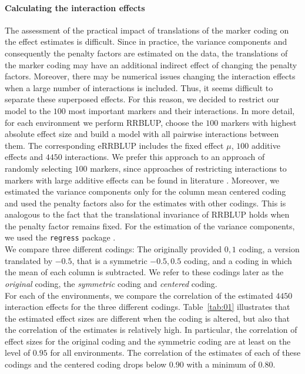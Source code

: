 \documentclass{bmcart}
\newcommand{\0}{\mathbf{0}}
\begin{document}
\paragraph{Calculating the interaction effects} 
The assessment of the practical impact of translations of the marker coding on the effect estimates is difficult. 
Since in practice, the variance components and consequently the penalty factors are estimated on the data, the translations of the marker coding may have an additional indirect effect of changing the penalty factors. Moreover, there may be numerical issues changing the interaction effects when a large number of interactions is included.
Thus, it seems difficult to separate these superposed effects. For this reason, we decided to restrict our model to the $100$ most important markers and their interactions. In more detail, for each environment we perform RRBLUP, choose the $100$ markers with highest absolute effect size and build a model with all pairwise interactions between them. The corresponding eRRBLUP includes the fixed effect $\mu$, $100$ additive effects and $4450$ interactions. We prefer this approach to an approach of randomly selecting $100$ markers, since approaches of restricting interactions to markers with large additive effects can be found in literature \cite{karkkainen2015efficient}. Moreover, we estimated the variance components only for the column mean centered coding and used the penalty factors also for the estimates with other codings. This is analogous to the fact that the translational invariance of RRBLUP holds when the penalty factor remains fixed. For the estimation of the variance components, we used the \texttt{regress} package \cite{clifford2014regress}.\\

We compare three different codings: The originally provided ${0,1}$ coding, a version translated by $-0.5$, that is a symmetric $-0.5, 0.5$ coding, and a coding in which the mean of each column is subtracted. We refer to these codings later as the \emph{original} coding, the \emph{symmetric} coding and \emph{centered} coding. \\

For each of the environments, we compare the correlation of the estimated $4450$ interaction effects for the three different codings. 
Table~\ref{tab:01} illustrates that the estimated effect sizes are different when the coding is altered, but also that the correlation of the estimates is relatively high.
In particular, the correlation of effect sizes for the original coding and the symmetric coding are at least on the level of $0.95$ for all environments. 
The correlation of the estimates of each of these codings and the centered coding drops below $0.90$ with a minimum of $0.80$. 
\end{document}
